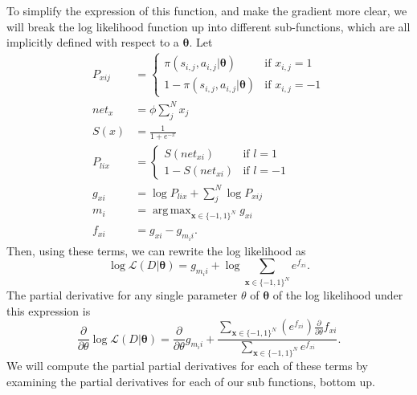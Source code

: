 \documentclass{article}
\DeclareMathOperator*{\argmax}{arg\,max}
\begin{document}
To simplify the expression of this function, and make the gradient more clear, we will break the log likelihood function up into different sub-functions, which are all implicitly defined with respect to a $\bm{\theta}$. Let
\begin{align}
P_{xij} &= \begin{cases}
\pi(s_{i,j}, a_{i,j} | \bm{\theta}) & \mbox{if } x_{i,j} = 1 \\
1 - \pi(s_{i,j}, a_{i,j} | \bm{\theta}) & \mbox{if } x_{i,j} = -1
\end{cases} \\
net_{x} &= \phi \sum_j^N x_{j} \\
S(x) &= \frac{1}{1 + e^{-x}} \\
P_{lix} &= \begin{cases}
S(net_{xi}) & \mbox{if } l = 1 \\
1 - S(net_{xi}) & \mbox{if } l = -1
\end{cases} \\
g_{xi} &= \log P_{lix} + \sum_j^N \log P_{xij} \\
m_i &= \argmax_{\mathbf{x} \in \{-1, 1\}^N} g_{xi} \\
f_{xi} &= g_{xi} - g_{m_ii}.
\end{align}
Then, using these terms, we can rewrite the log likelihood as
\begin{equation}
\log \mathcal{L}(D | \bm{\theta}) = g_{m_ii} + \log \sum_{\mathbf{x} \in \{-1, 1\}^N} e^{f_{xi}}.
\end{equation}
The partial derivative for any single parameter $\theta$ of $\bm{\theta}$ of the log likelihood under this expression is
\begin{equation}
\frac{\partial}{\partial \theta} \log \mathcal{L}(D | \bm{\theta}) = \frac{\partial}{\partial \theta} g_{m_ii} + \frac{\sum\limits_{\mathbf{x} \in \{-1, 1\}^N} \left( e^{f_{xi}} \right) \frac{\partial}{\partial \theta} f_{xi}}{\sum\limits_{\mathbf{x} \in \{-1, 1\}^N} e^{f_{xi}}}.
\end{equation}
We will compute the partial partial derivatives for each of these terms by examining the partial derivatives for each of our sub functions, bottom up.
\end{document}
